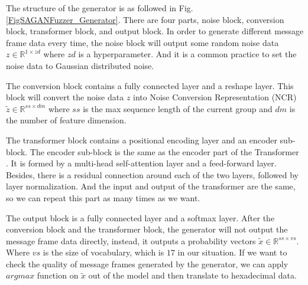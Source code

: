 The structure of the generator is as followed in Fig. \ref{FigSAGANFuzzer_Generator}. There are four parts, noise block, conversion block, transformer block, and output block. In order to generate different message frame data every time, the noise block will output some random noise data $z \in \mathbb{R}^{1 \times zd}$ where $zd$ is a hyperparameter. And it is a common practice to set the noise data to Gaussian distributed noise. 

The conversion block contains a fully connected layer and a reshape layer. This block will convert the noise data $z$ into Noise Conversion Representation (NCR) $\tilde{z} \in \mathbb{R}^{ss \times dm}$ where $ss$ is the max sequence length of the current group and $dm$ is the number of feature dimension.

The transformer block contains a positional encoding layer and an encoder sub-block. The encoder sub-block is the same as the encoder part of the Transformer \cite{vaswani2017attention}. It is formed by a multi-head self-attention layer and a feed-forward layer. Besides, there is a residual connection around each of the two layers, followed by layer normalization. And the input and output of the transformer are the same, so we can repeat this part as many times as we want.

The output block is a fully connected layer and a softmax layer. After the conversion block and the transformer block, the generator will not output the message frame data directly, instead, it outputs a probability vectors $\tilde{x} \in \mathbb{R}^{ss \times vs}$. Where $vs$ is the size of vocabulary, which is $17$ in our situation. If we want to check the quality of message frames generated by the generator, we can apply $argmax$ function on $\tilde{x}$ out of the model and then translate to hexadecimal data.

